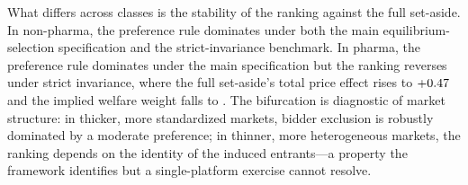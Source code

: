 What differs across classes is the stability of the ranking against the full set-aside. In non-pharma, the preference rule dominates under both the main equilibrium-selection specification and the strict-invariance benchmark. In pharma, the preference rule dominates under the main specification but the ranking reverses under strict invariance, where the full set-aside's total price effect rises to $+0.47$ and the implied welfare weight falls to \welfWeightSiPh. The bifurcation is diagnostic of market structure: in thicker, more standardized markets, bidder exclusion is robustly dominated by a moderate preference; in thinner, more heterogeneous markets, the ranking depends on the identity of the induced entrants---a property the framework identifies but a single-platform exercise cannot resolve.
